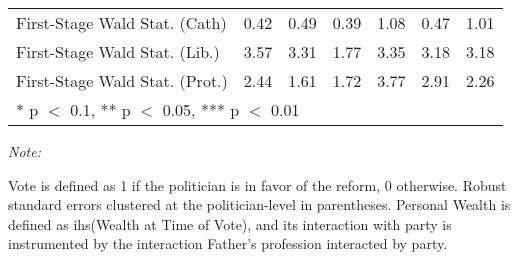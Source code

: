 \begin{table}[!h]
{\begin{threeparttable}
\begin{tabular}[t]{lcccccc}
First-Stage Wald Stat. (Cath) & 0.42 & 0.49 & 0.39 & 1.08 & 0.47 & 1.01\\
First-Stage Wald Stat. (Lib.) & 3.57 & 3.31 & 1.77 & 3.35 & 3.18 & 3.18\\
First-Stage Wald Stat. (Prot.) & 2.44 & 1.61 & 1.72 & 3.77 & 2.91 & 2.26\\
\bottomrule
\multicolumn{7}{l}{\rule{0pt}{1em}* p $<$ 0.1, ** p $<$ 0.05, *** p $<$ 0.01}\\
\end{tabular}
\begin{tablenotes}[para]
\item \textit{Note: } 
\item Vote is defined as 1 if the politician is in favor of the reform, 0 otherwise. Robust standard errors clustered at the politician-level in parentheses. Personal Wealth is defined as ihs(Wealth at Time of Vote), and its interaction with party is instrumented by the interaction Father's profession interacted by party.
\end{tablenotes}
\end{threeparttable}}
\end{table}
